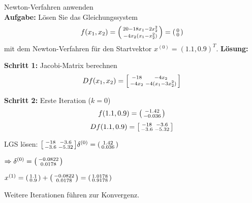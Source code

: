 \begin{example2}{Newton-Verfahren anwenden}\\
\textbf{Aufgabe:} Lösen Sie das Gleichungssystem 
$$f(x_1, x_2) = \begin{psmallmatrix} 20 - 18x_1 - 2x_2^2 \\ -4x_2(x_1 - x_2^2) \end{psmallmatrix} = \begin{psmallmatrix} 0 \\ 0 \end{psmallmatrix}$$
mit dem Newton-Verfahren für den Startvektor $x^{(0)} = (1.1, 0.9)^T$.
\tcblower
\textbf{Lösung:}

\textbf{Schritt 1:} Jacobi-Matrix berechnen
$$Df(x_1, x_2) = \begin{bsmallmatrix} -18 & -4x_2 \\ -4x_2 & -4(x_1 - 3x_2^2) \end{bsmallmatrix}$$

\textbf{Schritt 2:} Erste Iteration ($k = 0$)
$$f(1.1, 0.9) = \begin{psmallmatrix} -1.42 \\ -0.036 \end{psmallmatrix}$$
$$Df(1.1, 0.9) = \begin{bsmallmatrix} -18 & -3.6 \\ -3.6 & -5.32 \end{bsmallmatrix}$$

LGS lösen: $\begin{bsmallmatrix} -18 & -3.6 \\ -3.6 & -5.32 \end{bsmallmatrix} \delta^{(0)} = \begin{psmallmatrix} 1.42 \\ 0.036 \end{psmallmatrix}$

$\Rightarrow \delta^{(0)} = \begin{psmallmatrix} -0.0822 \\ 0.0178 \end{psmallmatrix}$

$x^{(1)} = \begin{psmallmatrix} 1.1 \\ 0.9 \end{psmallmatrix} + \begin{psmallmatrix} -0.0822 \\ 0.0178 \end{psmallmatrix} = \begin{psmallmatrix} 1.0178 \\ 0.9178 \end{psmallmatrix}$

Weitere Iterationen führen zur Konvergenz.
\end{example2}

